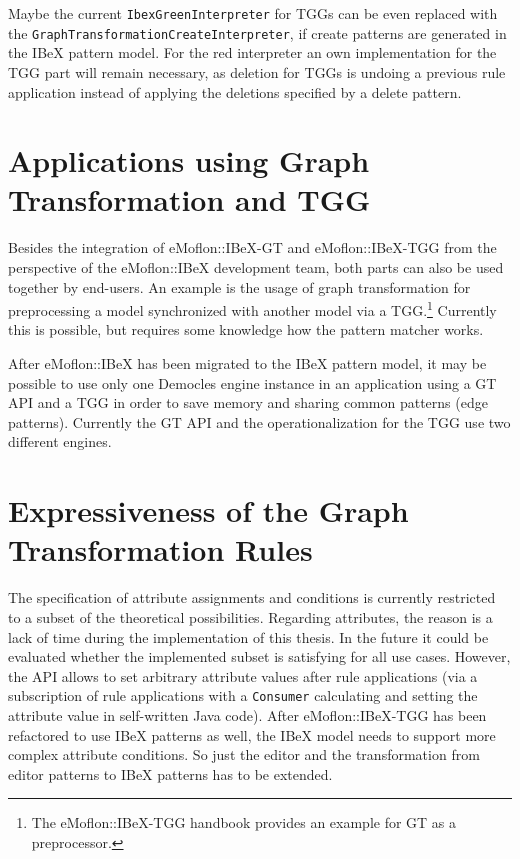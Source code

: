 \noindent
Maybe the current \texttt{IbexGreenInterpreter} for TGGs can be even replaced with the \texttt{GraphTransformationCreateInterpreter}, if create patterns are generated in the IBeX pattern model.
For the red interpreter an own implementation for the TGG part will remain necessary, as deletion for TGGs is undoing a previous rule application instead of applying the deletions specified by a delete pattern.

\section{Applications using Graph Transformation and TGG}
\label{applications-using-gt-and-tggs}
Besides the integration of eMoflon::IBeX-GT and eMoflon::IBeX-TGG from the perspective of the eMoflon::IBeX development team, both parts can also be used together by end-users.
An example is the usage of graph transformation for preprocessing a model synchronized with another model via a TGG.\footnote{The eMoflon::IBeX-TGG handbook \cite{eMoflonIBeX-TGG-Handbook} provides an example for GT as a preprocessor.}
Currently this is possible, but requires some knowledge how the pattern matcher works.

After eMoflon::IBeX has been migrated to the IBeX pattern model, it may be possible to use only one Democles engine instance in an application using a GT API and a TGG in order to save memory and sharing common patterns (\eg edge patterns).
Currently the GT API and the operationalization for the TGG use two different engines.

\section{Expressiveness of the Graph Transformation Rules}
\label{expressiveness}
The specification of attribute assignments and conditions is currently restricted to a subset of the theoretical possibilities.
Regarding attributes, the reason is a lack of time during the implementation of this thesis.
In the future it could be evaluated whether the implemented subset is satisfying for all use cases.
However, the API allows to set arbitrary attribute values after rule applications (\eg via a subscription of rule applications with a \texttt{Consumer} calculating and setting the attribute value in self-written Java code).
After eMoflon::IBeX-TGG has been refactored to use IBeX patterns as well, the IBeX model needs to support more complex attribute conditions.
So just the editor and the transformation from editor patterns to IBeX patterns has to be extended.


